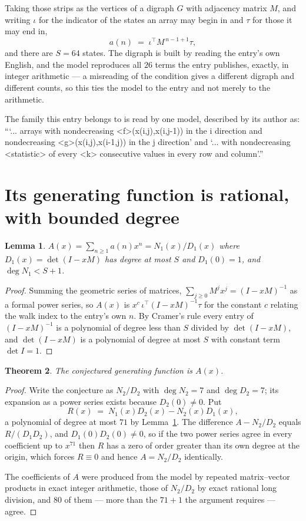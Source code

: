 \documentclass[11pt,a4paper]{article}
\theoremstyle{plain}
\newtheorem{theorem}{Theorem}
\newtheorem{lemma}[theorem]{Lemma}
\theoremstyle{definition}
\begin{document}
Taking those strips as the vertices of a digraph $G$ with adjacency matrix $M$, and writing
$\iota$ for the indicator of the states an array may begin in and $\tau$ for those it may end
in,
\[
a(n)\;=\;\iota^{\!\top}M^{\,n-1+1}\tau ,
\]
and there are $S=64$ states. The digraph is built by reading the entry's own English, and the
model reproduces all $26$ terms the entry publishes, exactly, in integer arithmetic --- a
misreading of the condition gives a different digraph and different counts, so this ties the
model to the entry and not merely to the arithmetic.

The family this entry belongs to is read by one model, described by its author as: ```... arrays with nondecreasing <f>(x(i,j),x(i,j-1)) in the i direction and nondecreasing <g>(x(i,j),x(i-1,j)) in the j direction' and `... with nondecreasing <statistic> of every <k> consecutive values in every row and column'.''


\section{Its generating function is rational, with bounded degree}

\begin{lemma}\label{lem:rat}
$A(x)=\sum_{n\ge1}a(n)x^n=N_1(x)/D_1(x)$ where $D_1(x)=\det(I-xM)$ has degree at most
$S$ and $D_1(0)=1$, and $\deg N_1<S+1$.
\end{lemma}

\begin{proof}
Summing the geometric series of matrices, $\sum_{j\ge0}M^jx^j=(I-xM)^{-1}$ as a formal
power series, so $A(x)$ is $x^{c}\,\iota^{\!\top}(I-xM)^{-1}\tau$ for the constant $c$
relating the walk index to the entry's own $n$. By Cramer's rule every entry of
$(I-xM)^{-1}$ is a polynomial of degree less than $S$ divided by $\det(I-xM)$, and
$\det(I-xM)$ is a polynomial of degree at most $S$ with constant term $\det I=1$.
\end{proof}

\begin{theorem}
The conjectured generating function is $A(x)$.
\end{theorem}

\begin{proof}
Write the conjecture as $N_2/D_2$ with $\deg N_2=7$ and $\deg D_2=7$; its expansion as a
power series exists because $D_2(0)\neq0$. Put
\[
R(x)\;=\;N_1(x)D_2(x)-N_2(x)D_1(x),
\]
a polynomial of degree at most $71$ by Lemma~\ref{lem:rat}. The difference
$A-N_2/D_2$ equals $R/(D_1D_2)$, and $D_1(0)D_2(0)\neq0$, so if the two power series agree in
every coefficient up to $x^{71}$ then $R$ has a zero of order greater than its own
degree at the origin, which forces $R\equiv0$ and hence $A=N_2/D_2$ identically.

The coefficients of $A$ were produced from the model by repeated matrix--vector products in
exact integer arithmetic, those of $N_2/D_2$ by exact rational long division, and $80$
of them --- more than the $71+1$ the argument requires --- agree.
\end{proof}
\end{document}
